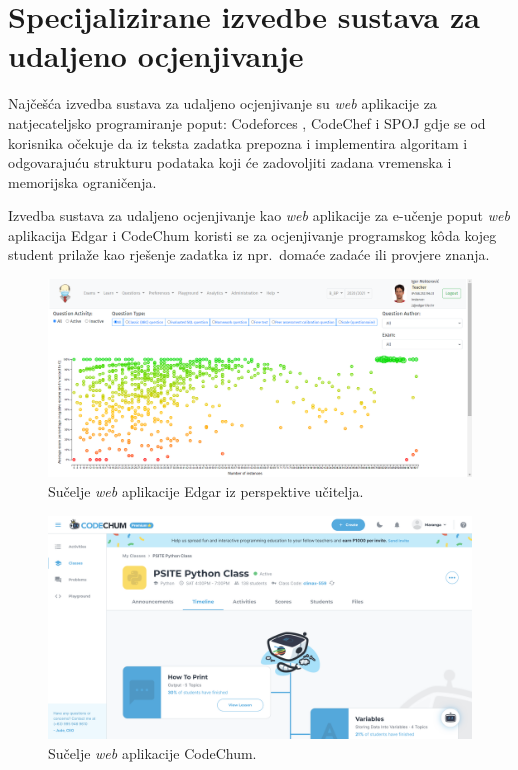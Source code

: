 \documentclass[times, utf8, diplomski]{fer}
\begin{document}
\section{Specijalizirane izvedbe sustava za udaljeno ocjenjivanje}
Najčešća izvedba sustava za udaljeno ocjenjivanje su \textit{web} aplikacije za natjecateljsko programiranje poput: Codeforces \citep{Codeforces}, CodeChef \citep{CodeChef} i SPOJ \citep{SPOJ} gdje se od korisnika očekuje da iz teksta zadatka prepozna i implementira algoritam i odgovarajuću strukturu podataka koji će zadovoljiti zadana vremenska i memorijska ograničenja. 

Izvedba sustava za udaljeno ocjenjivanje kao \textit{web} aplikacije za e-učenje poput \textit{web} aplikacija Edgar \citep{mekterovic2020building} i CodeChum \citep{maranga2019codechum} koristi se za ocjenjivanje  programskog kôda kojeg student prilaže kao rješenje zadatka iz npr.\ domaće zadaće ili provjere znanja.

\begin{figure}[htb]
	\centering
	\includegraphics[width=\textwidth]{images/Edgar UI.png}
	\caption{
		Sučelje \textit{web} aplikacije Edgar iz perspektive učitelja.
	}
	\label{fig:edgar-ui}
\end{figure}

\begin{figure}[htb]
	\centering
	\includegraphics[width=\textwidth]{images/CodeChum UI.png}
	\caption{
		Sučelje \textit{web} aplikacije CodeChum.
	}
	\label{fig:codechum-ui}
\end{figure}
\end{document}
